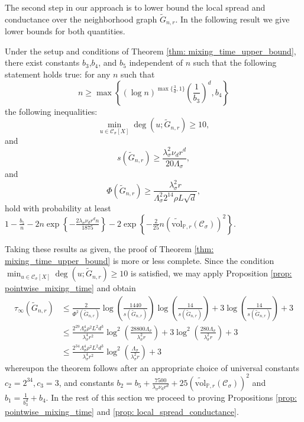 \documentclass[11pt,twoside]{article}
\newcommand{\set}[1]{\left\{#1\right\}}
\newcommand{\vol}{\mathrm{vol}}
\newcommand{\1}{\mathbbm{1}}
\newcommand{\Xbf}{X}
\newcommand{\Pbb}{\mathbb{P}}
\newcommand{\Cset}{\mathcal{C}}
\newcommand{\Csig}{\Cset_{\sigma}}
\begin{document}
The second step in our approach is to lower bound the local spread and conductance over the neighborhood graph $\widetilde{G}_{n,r}$. In the following result we give lower bounds for both quantities. 
\begin{proposition}
	\label{prop: local_spread_conductance}
	Under the setup and conditions of Theorem \ref{thm: mixing_time_upper_bound}, there exist constants $b_3$,$b_4$, and $b_5$ independent of $n$ such that the following statement holds true: for any $n$ such that
	\begin{equation*}
	n \geq \max\left\{(\log n)^{\max\{\frac{3}{d},1\}}\left(\frac{1}{b_3}\right)^d, b_4\right\}
	\end{equation*}
	the following inequalities:
	\begin{equation}
	\label{eqn:min_degree}
	\min_{u \in \Csig[\Xbf]} \deg(u;\widetilde{G}_{n,r}) \geq 10,
	\end{equation}
	and
	\begin{equation}
	\label{eqn: local_spread}
	s(\widetilde{G}_{n,r}) \geq \frac{\lambda_{\sigma}^2 \nu_d r^d}{20\Lambda_{\sigma}},
	\end{equation}
	and
	\begin{equation}
	\label{eqn: conductance}
	\Phi(\widetilde{G}_{n,r}) \geq \frac{\lambda_{\sigma}^2 r}{\Lambda_{\sigma}^2 2^{14} \rho L \sqrt{d}},
	\end{equation}
	hold with probability at least $1 - \frac{b_5}{n} - 2n\exp\set{-\frac{2\lambda_{\sigma} \nu_d r^d n}{1875}} - 2\exp\set{-\frac{2}{25}n(\widetilde{\vol}_{\Pbb,r}(\Csig))^2}$.
\end{proposition}

Taking these results as given, the proof of Theorem \ref{thm: mixing_time_upper_bound} is more or less complete. Since the condition $\min_{u \in \Csig[\Xbf]} \deg(u;\widetilde{G}_{n,r}) \geq 10$ is satisfied, we may apply Proposition \ref{prop: pointwise_mixing_time} and obtain
\begin{align*}
\tau_{\infty}(\widetilde{G}_{n,r}) & \leq  \frac{2}{\Phi^2(\widetilde{G}_{n,r})} \log \left(\frac{1440}{s(\widetilde{G}_{n,r})}\right)\log \left(\frac{14}{s(\widetilde{G}_{n,r})}\right)  + 3 \log \left(\frac{14}{s(\widetilde{G}_{n,r})}\right) + 3
\\
& \leq \frac{2^{29}\Lambda_{\sigma}^4\rho^2L^2 d^3}{\lambda_{\sigma}^4 r^2} \log^2\left(\frac{28800\Lambda_{\sigma}}{\lambda_{\sigma}^2 r}\right) + 3 \log^2\left(\frac{280\Lambda_{\sigma}}{\lambda_{\sigma}^2 r}\right) + 3 \\
& \leq \frac{2^{34}\Lambda_{\sigma}^4\rho^2L^2 d^3}{\lambda_{\sigma}^4 r^2} \log^2\left(\frac{\Lambda_{\sigma}}{\lambda_{\sigma}^2 r}\right) + 3
\end{align*}
whereupon the theorem follows after an appropriate choice of universal constants $c_2 = 2^{34}, c_3 = 3$, and constants $b_2 = b_5 + \frac{7500}{\lambda_{\sigma}\nu_dr^d} + 25(\widetilde{\vol}_{\Pbb,r}(\Csig))^2$ and $b_1 = \frac{1}{b_3^d} + b_4$. In the rest of this section we proceed to proving Propositions \ref{prop: pointwise_mixing_time} and \ref{prop: local_spread_conductance}.
\end{document}
